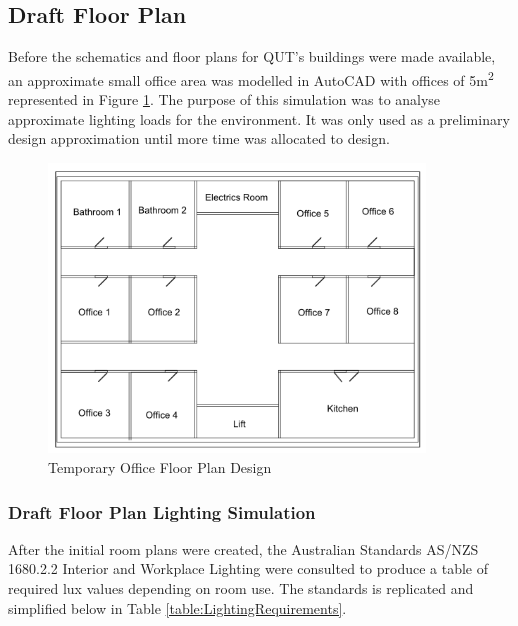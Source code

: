 
\subsection{Draft Floor Plan} \label{section:draft-floor-plan}

Before the schematics and floor plans for QUT's buildings were made available, an approximate small office area was modelled in AutoCAD with offices of 5\si{m^2} represented in Figure \ref{fig:RoughFloorplan}. The purpose of this simulation was to analyse approximate lighting loads for the environment. It was only used as a preliminary design approximation until more time was allocated to design.  

\begin{figure}[H]
\hfill\includegraphics[width = 100mm]{images/Rough_Floorplan}\hspace*{\fill}
\caption{Temporary Office Floor Plan Design} 
\label{fig:RoughFloorplan}
\end{figure} 

\subsubsection{Draft Floor Plan Lighting Simulation}

After the initial room plans were created, the Australian Standards AS/NZS 1680.2.2 Interior and Workplace Lighting were consulted to produce a table of required lux values depending on room use. The standards is replicated and simplified below in Table \ref{table:LightingRequirements}.

